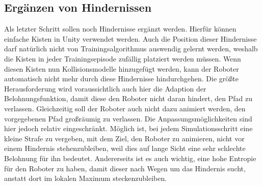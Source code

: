 \subsection{Ergänzen von Hindernissen}
Als letzter Schritt sollen noch Hindernisse ergänzt werden.
Hierfür können einfache Kisten in Unity verwendet werden.
Auch die Position dieser Hindernisse darf natürlich nicht von Trainingsalgorithmus auswendig gelernt werden, weshalb die Kisten in jeder Trainingsepisode zufällig platziert werden müssen.
Wenn diesen Kisten nun Kollisionsmodelle hinzugefügt werden, kann der Roboter automatisch nicht mehr durch diese Hindernisse hindurchgehen.
Die größte Herausforderung wird voraussichtlich auch hier die Adaption der Belohnungsfunktion, damit diese den Roboter nicht daran hindert, den Pfad zu verlassen.
Gleichzeitig soll der Roboter auch nicht dazu animiert werden, den vorgegebenen Pfad großräumig zu verlassen.
Die Anpassungsmöglichkeiten sind hier jedoch relativ eingeschränkt.
Möglich ist, bei jedem Simulationsschritt eine kleine Strafe zu vergeben, mit dem Ziel, den Roboter zu animieren, nicht vor einem Hindernis stehenzubleiben, weil dies auf lange Sicht eine sehr schlechte Belohnung für ihn bedeutet.
Andererseits ist es auch wichtig, eine hohe Entropie für den Roboter zu haben, damit dieser nach Wegen um das Hindernis sucht, anstatt dort im lokalen Maximum steckenzubleiben.

    
